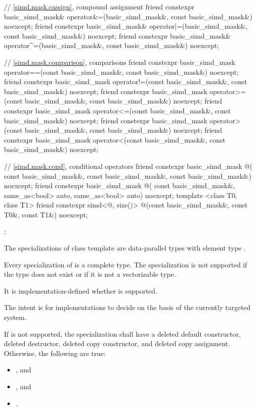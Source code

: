 \begin{codeblock}
{  // \ref{simd.mask.cassign},  compound assignment
  friend constexpr basic_simd_mask&
    operator&=(basic_simd_mask&, const basic_simd_mask&) noexcept;
  friend constexpr basic_simd_mask&
    operator|=(basic_simd_mask&, const basic_simd_mask&) noexcept;
  friend constexpr basic_simd_mask&
    operator^=(basic_simd_mask&, const basic_simd_mask&) noexcept;

  // \ref{simd.mask.comparison},  comparisons
  friend constexpr basic_simd_mask
    operator==(const basic_simd_mask&, const basic_simd_mask&) noexcept;
  friend constexpr basic_simd_mask
    operator!=(const basic_simd_mask&, const basic_simd_mask&) noexcept;
  friend constexpr basic_simd_mask
    operator>=(const basic_simd_mask&, const basic_simd_mask&) noexcept;
  friend constexpr basic_simd_mask
    operator<=(const basic_simd_mask&, const basic_simd_mask&) noexcept;
  friend constexpr basic_simd_mask
    operator>(const basic_simd_mask&, const basic_simd_mask&) noexcept;
  friend constexpr basic_simd_mask
    operator<(const basic_simd_mask&, const basic_simd_mask&) noexcept;

  // \ref{simd.mask.cond},  conditional operators
  friend constexpr basic_simd_mask @\simdselect@(
    const basic_simd_mask&, const basic_simd_mask&, const basic_simd_mask&) noexcept;
  friend constexpr basic_simd_mask @\simdselect@(
    const basic_simd_mask&, same_as<bool> auto, same_as<bool> auto) noexcept;
  template <class T0, class T1>
    friend constexpr simd<@\seebelow@, size()>
      @\simdselect@(const basic_simd_mask&, const T0&, const T1&) noexcept;
};
\end{codeblock}

\pnum
The specializations of class template  are data-parallel types with element type .

\pnum
Every specialization of  is a complete type.
The specialization  is not supported if the type  does not exist or if it is not a vectorizable type.

It is implementation-defined whether  is supported.
\begin{note}The intent is for implementations to decide on the basis of the currently targeted system.\end{note}

If  is not supported, the specialization shall have a deleted default constructor, deleted destructor, deleted copy constructor, and deleted copy assignment.
Otherwise, the following are true:
\begin{itemize}
  \item {}, and
  \item {}, and
  \item {}.
\end{itemize}

